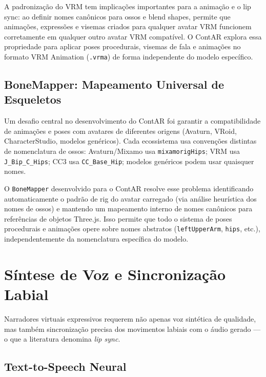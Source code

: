 \documentclass[
  12pt,
  openright,
  twoside,
  a4paper,
  english,
  brazil
]{abntex2}
\begin{document}
A padronização do VRM tem implicações importantes para a animação e o
lip sync: ao definir nomes canônicos para ossos e blend shapes, permite
que animações, expressões e visemas criados para qualquer avatar VRM
funcionem corretamente em qualquer outro avatar VRM compatível. O ContAR
explora essa propriedade para aplicar poses procedurais, visemas de fala
e animações no formato VRM Animation (\texttt{.vrma}) de forma
independente do modelo específico.

\subsection{BoneMapper: Mapeamento Universal de Esqueletos}
\label{subsec:bonemapper}

Um desafio central no desenvolvimento do ContAR foi garantir a
compatibilidade de animações e poses com avatares de diferentes origens
(Avaturn, VRoid, CharacterStudio, modelos genéricos). Cada ecossistema
usa convenções distintas de nomenclatura de ossos: Avaturn/Mixamo usa
\texttt{mixamorigHips}; VRM usa \texttt{J\_Bip\_C\_Hips}; CC3 usa
\texttt{CC\_Base\_Hip}; modelos genéricos podem usar quaisquer nomes.

O \texttt{BoneMapper} desenvolvido para o ContAR resolve esse problema
identificando automaticamente o padrão de rig do avatar carregado
(via análise heurística dos nomes de ossos) e mantendo um mapeamento
interno de nomes canônicos para referências de objetos Three.js. Isso
permite que todo o sistema de poses procedurais e animações opere
sobre nomes abstratos (\texttt{leftUpperArm}, \texttt{hips}, etc.),
independentemente da nomenclatura específica do modelo.

\section{Síntese de Voz e Sincronização Labial}
\label{sec:tts-lipsync}

Narradores virtuais expressivos requerem não apenas voz sintética de
qualidade, mas também sincronização precisa dos movimentos labiais com
o áudio gerado — o que a literatura denomina \textit{lip sync}.

\subsection{Text-to-Speech Neural}
\label{subsec:tts}
\end{document}
